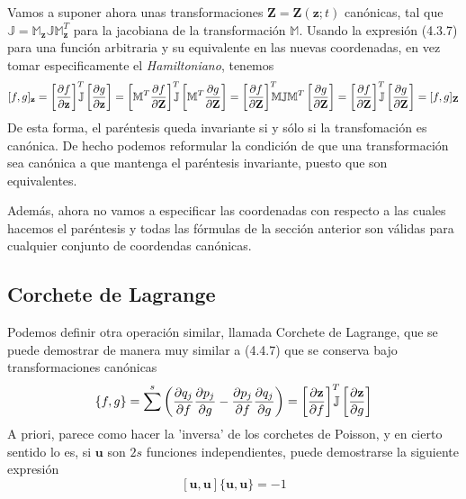 Vamos a suponer ahora unas transformaciones $\mathbf{Z}=\mathbf{Z}(\mathbf{z};t)$ canónicas, tal que $\mathbb{J} = \mathbb{M}_\mathbf{z}\mathbb{J}\mathbb{M}_\mathbf{z}^T$ para la jacobiana de la transformación $\mathbb{M}$. Usando la expresión (4.3.7) para una función arbitraria y su equivalente en las nuevas coordenadas, en vez tomar especificamente el \textit{Hamiltoniano}, tenemos
\begin{equation} \label{4.4.7}
    [f,g]_\mathbf{z} = \left[\frac{\partial f}{\partial \mathbf{z}}\right]^T \hspace{-7pt} \mathbb{J} \left[\frac{\partial g}{\partial \mathbf{z}}\right] = \left[\mathbb{M}^T\frac{\partial f}{\partial \mathbf{Z}}\right]^T \hspace{-7pt} \mathbb{J} \left[\mathbb{M}^T\frac{\partial g}{\partial \mathbf{Z}}\right] = \left[\frac{\partial f}{\partial \mathbf{Z}}\right]^T \hspace{-7pt}\mathbb{M} \mathbb{J}\mathbb{M}^T \left[\frac{\partial g}{\partial \mathbf{Z}}\right] = \left[\frac{\partial f}{\partial \mathbf{Z}}\right]^T \hspace{-7pt} \mathbb{J} \left[\frac{\partial g}{\partial \mathbf{Z}}\right] = [f,g]_\mathbf{Z}
\end{equation} 
De esta forma, el paréntesis queda invariante si y sólo si la transfomación es canónica. De hecho podemos reformular la condición de que una transformación sea canónica a que mantenga el paréntesis invariante, puesto que son equivalentes.

Además, ahora no vamos a especificar las coordenadas con respecto a las cuales hacemos el paréntesis y todas las fórmulas de la sección anterior son válidas para cualquier conjunto de coordendas canónicas.
\subsection{Corchete de Lagrange}
Podemos definir otra operación similar, llamada Corchete de Lagrange, que se puede demostrar de manera muy similar a (4.4.7) que se conserva bajo transformaciones canónicas
\begin{equation} \label{4.4.3}
    \{f,g\}=  \sum^s \left(\frac{\partial q_j}{\partial f}\frac{\partial p_j}{\partial g}-\frac{\partial p_j}{\partial f}\frac{\partial q_j}{\partial g}\right) = \left[\frac{\partial \mathbf{z}}{\partial f}\right]^T \hspace{-7pt} \mathbb{J} \left[\frac{\partial \mathbf{z}}{\partial g}\right]
\end{equation} 
A priori, parece como hacer la 'inversa' de los corchetes de Poisson, y en cierto sentido lo es, si $\mathbf{u}$ son $2s$ funciones independientes, puede demostrarse la siguiente expresión
\begin{equation} \label{4.4.3}
    [\mathbf{u},\mathbf{u}]\{\mathbf{u},\mathbf{u}\}=  -1
\end{equation} 
